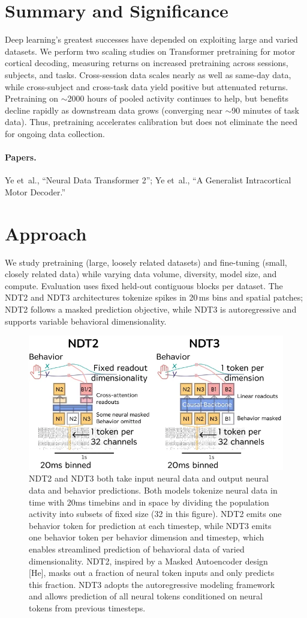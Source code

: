\documentclass[12pt,oneside]{report}
\begin{document}
\section{Summary and Significance}
Deep learning’s greatest successes have depended on exploiting large and varied datasets. We perform two scaling studies on Transformer pretraining for motor cortical decoding, measuring returns on increased pretraining across sessions, subjects, and tasks. Cross-session data scales nearly as well as same-day data, while cross-subject and cross-task data yield positive but attenuated returns. Pretraining on $\sim$2000 hours of pooled activity continues to help, but benefits decline rapidly as downstream data grows (converging near $\sim$90 minutes of task data). Thus, pretraining accelerates calibration but does not eliminate the need for ongoing data collection.

\paragraph{Papers.} Ye et~al., ``Neural Data Transformer 2''; Ye et~al., ``A Generalist Intracortical Motor Decoder.''

\section{Approach}
We study pretraining (large, loosely related datasets) and fine-tuning (small, closely related data) while varying data volume, diversity, model size, and compute. Evaluation uses fixed held-out contiguous blocks per dataset. The NDT2 and NDT3 architectures tokenize spikes in 20\,ms bins and spatial patches; NDT2 follows a masked prediction objective, while NDT3 is autoregressive and supports variable behavioral dimensionality.

\begin{figure}[h]
  \centering
  \includegraphics[width=0.5\linewidth]{ch2_ndt_models.png}
  \caption{NDT2 and NDT3 both take input neural data and output neural data and behavior predictions. Both models tokenize neural data in time with 20ms timebins and in space by dividing the population activity into subsets of fixed size (32 in this figure). NDT2 emits one behavior token for prediction at each timestep, while NDT3 emits one behavior token per behavior dimension and timestep, which enables streamlined prediction of behavioral data of varied dimensionality. NDT2, inspired by a Masked Autoencoder design [He], masks out a fraction of neural token inputs and only predicts this fraction. NDT3 adopts the autoregressive modeling framework and allows prediction of all neural tokens conditioned on neural tokens from previous timesteps.}
  \label{fig:ndt_models}
\end{figure}
\end{document}
